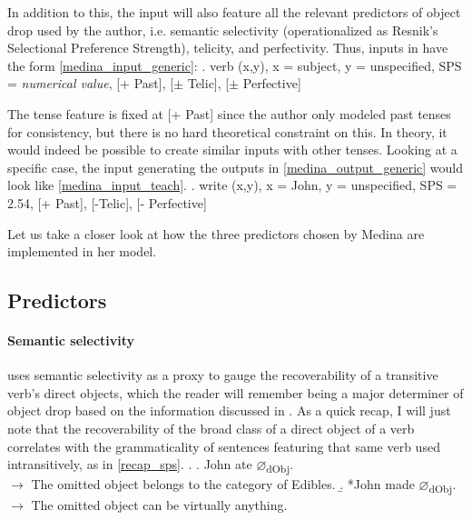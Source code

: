 In addition to this, the input will also feature all the relevant predictors of object drop used by the author, i.e. semantic selectivity (operationalized as Resnik's Selectional Preference Strength), telicity, and perfectivity. Thus, inputs in \textcite{Medina2007} have the form \ref{medina_input_generic}:
\ex. \label{medina_input_generic} verb (x,y), x = subject, y = unspecified, SPS = \textit{numerical value}, [+ Past], [$\pm$ Telic], [$\pm$ Perfective]

The tense feature is fixed at [+ Past] since the author only modeled past tenses for consistency, but there is no hard theoretical constraint on this. In theory, it would indeed be possible to create similar inputs with other tenses. Looking at a specific case, the input generating the outputs in \ref{medina_output_generic} would look like \ref{medina_input_teach}.
\ex. \label{medina_input_teach} write (x,y), x = John, y = unspecified, SPS = 2.54, [+ Past], [-Telic], [- Perfective]

Let us take a closer look at how the three predictors chosen by Medina are implemented in her model.


\subsection{Predictors} 

\paragraph{Semantic selectivity} \textcite{Medina2007} uses semantic selectivity as a proxy to gauge the recoverability of a transitive verb's direct objects, which the reader will remember being a major determiner of object drop based on the information discussed in . As a quick recap, I will just note that the recoverability of the broad class of a direct object of a verb correlates with the grammaticality of sentences featuring that same verb used intransitively, as in \ref{recap_sps}.
\ex. \label{recap_sps} \a. John ate $\varnothing$\textsubscript{dObj}. \\ $\longrightarrow$ The omitted object belongs to the category of Edibles.
\b. *John made $\varnothing$\textsubscript{dObj}. \\ $\longrightarrow$ The omitted object can be virtually anything.

